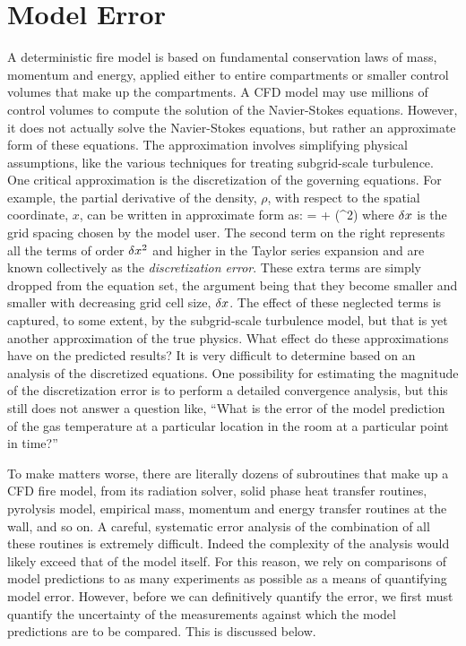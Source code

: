 \section{Model Error}

A deterministic fire model is based on fundamental conservation laws of mass, momentum and energy, applied either to entire compartments or smaller control
volumes that make up the compartments. A CFD model may use millions of control volumes to compute the solution of the Navier-Stokes equations.
However, it does not actually solve the Navier-Stokes equations, but rather an approximate form of these equations. The approximation involves simplifying
physical assumptions, like the various techniques for treating subgrid-scale turbulence.
One critical approximation is the discretization of the governing equations. For example, the partial derivative of the density, $\rho$,
with respect to the spatial coordinate, $x$, can be written in approximate form as:
\be {} =  + (\dx^2) \ee
where $\delta x$ is the grid spacing chosen by the model user.
The second term on the right represents all the terms of order $\delta x^2$ and higher in the Taylor series expansion and are known collectively as the
{\em discretization error}. These extra terms are simply dropped from
the equation set, the argument being that they become smaller and smaller with decreasing grid cell size, $\delta x$. The effect of these neglected terms is captured, to
some extent, by the subgrid-scale turbulence model, but that is yet another approximation of the true physics. What effect do these approximations have on
the predicted results? It is very difficult to determine based on an analysis of the discretized equations. One possibility for estimating
the magnitude of the discretization error is to perform a detailed
convergence analysis, but this still does not answer a
question like, ``What is the error of the model prediction of the gas
temperature at a particular location in the room at a particular point in time?''

To make matters worse, there are literally dozens of subroutines that make up a CFD fire model, from its radiation solver, solid phase heat transfer routines, pyrolysis model,
empirical mass, momentum and energy transfer routines at the wall, and so on. A careful, systematic error analysis of the combination of all these routines is
extremely difficult. Indeed the complexity of the analysis would likely exceed that of the model itself. For this reason, we rely on comparisons of model predictions to as many
experiments as possible as a means of quantifying model error. However, before we can definitively quantify the error, we first must quantify the uncertainty of the
measurements against which the model predictions are to be compared. This is discussed below.


